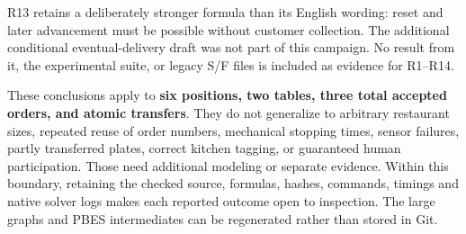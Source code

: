 \documentclass[11pt,a4paper]{article}
\begin{document}
R13 retains a deliberately stronger formula than its English wording: reset and later advancement must be possible without customer collection. The additional conditional eventual-delivery draft was not part of this campaign. No result from it, the experimental suite, or legacy S/F files is included as evidence for R1--R14.

These conclusions apply to \textbf{six positions, two tables, three total accepted orders, and atomic transfers}. They do not generalize to arbitrary restaurant sizes, repeated reuse of order numbers, mechanical stopping times, sensor failures, partly transferred plates, correct kitchen tagging, or guaranteed human participation. Those need additional modeling or separate evidence. Within this boundary, retaining the checked source, formulas, hashes, commands, timings and native solver logs makes each reported outcome open to inspection. The large graphs and PBES intermediates can be regenerated rather than stored in Git.
\end{document}
